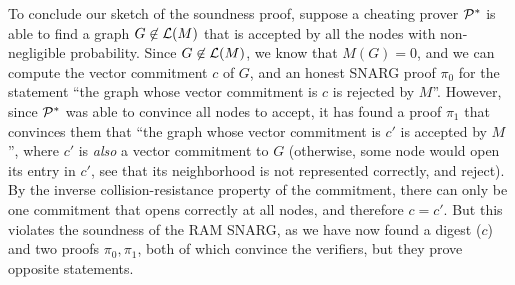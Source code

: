 To conclude our sketch of the soundness proof, suppose a cheating prover $\mathcal{P}^*$ is able
to
find a graph $G \not \in \mathcal{L}(M)$ that is accepted by all the nodes with non-negligible probability.
Since $G \not \in \mathcal{L}(M)$, we know that $M(G) = 0$,
and we can compute the vector commitment $c$ of $G$,
and an honest SNARG proof $\pi_0$ for the statement ``the graph whose vector commitment is $c$
is rejected by $M$''.
However, since $\mathcal{P}^*$ was able to convince all nodes to accept,
it has found a proof $\pi_1$ that convinces them that ``the graph whose vector commitment is $c'$
is accepted by $M$'', where $c'$ is \emph{also} a vector commitment to $G$
(otherwise, some node would open its entry in $c'$, see that its neighborhood is not represented correctly, and reject).
By the inverse collision-resistance property of the commitment,
there can only be one commitment that opens correctly at all nodes, and therefore $c = c'$.
But this violates the soundness of the RAM SNARG, as we have now found a digest ($c$)
and two proofs $\pi_0, \pi_1$,
both of which convince the verifiers,
but they prove opposite statements.



